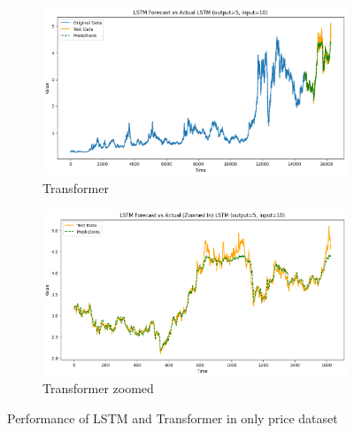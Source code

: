 \documentclass[project-plan]{report-template}
\begin{document}
\begin{figure}[h]
    \begin{subfigure}[b]{0.45\textwidth}
        \centering
        \includegraphics[width=\textwidth]{transformer.png}
        \caption{Transformer}
        \label{fig:image3}
    \end{subfigure}
    \hfill
    \begin{subfigure}[b]{0.45\textwidth}
        \centering
        \includegraphics[width=\textwidth]{transformer_zoomed.png}
        \caption{Transformer zoomed}
        \label{Transformer zoomed}
    \end{subfigure}

    \caption{Performance of LSTM and Transformer in only price dataset}
    \label{fig:four_images}
\end{figure}
\end{document}
